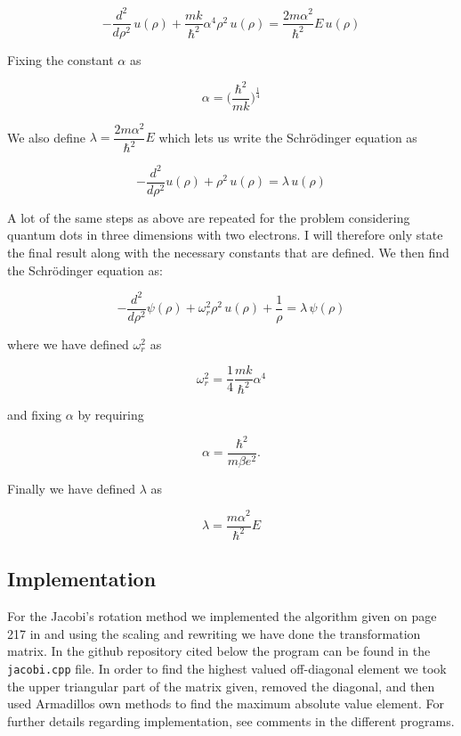 \documentclass[a4paper, fontsize=11pt]{article}
\begin{document}
\begin{equation}
-\dfrac{d^2}{d\rho^2} \, u(\rho) + \dfrac{mk}{\hbar^2} \alpha^4 \rho^2 \, u(\rho) = \dfrac{2m\alpha^2}{\hbar^2} E \, u(\rho) 
\end{equation}

Fixing the constant $\alpha$ as 

\begin{equation}
\alpha=\Big(\dfrac{\hbar^2}{mk}\Big)^{\frac{1}{4}}
\end{equation} 

We also define $\lambda=\dfrac{2m\alpha^2}{\hbar^2}E$ which lets us write the Schr\"{o}dinger equation as

\begin{equation}
-\dfrac{d^2}{d\rho^2}u(\rho) + \rho^2 \, u(\rho) = \lambda \, u(\rho)
\end{equation}

A lot of the same steps as above are repeated for the problem considering quantum dots in three dimensions with two electrons. I will therefore only state the final result along with the necessary constants that are defined. We then find the Schr\"{o}dinger equation as:

\begin{equation}
-\dfrac{d^2}{d\rho^2}\psi(\rho) + \omega^2_{r}\rho^2 \, u(\rho) + \frac{1}{\rho} = \lambda \, \psi(\rho)
\end{equation}

where we have defined  $\omega_{r}^2$ as

\begin{equation}
\omega^2_{r}=\dfrac{1}{4} \dfrac{mk}{\hbar^2} \alpha^4
\end{equation}

and fixing $\alpha$ by requiring 

\begin{equation}
\alpha = \dfrac{\hbar^2}{m\beta e^2}.
\end{equation}

Finally we have defined $\lambda$ as

\begin{equation}
\lambda=\dfrac{m\alpha^2}{\hbar^2}E
\end{equation}



\subsection{Implementation}

For the Jacobi's rotation method we implemented the algorithm given on page 217 in \cite{Jensen} and using the scaling and rewriting we have done the transformation matrix. In the github repository cited below the program can be found in the \verb+jacobi.cpp+ file. In order to find the highest valued off-diagonal element we took the upper triangular part of the matrix given, removed the diagonal, and then used Armadillos own methods to find the maximum absolute value element. For further details regarding implementation, see comments in the different programs.
\end{document}

